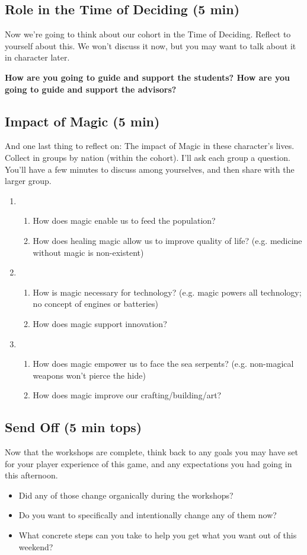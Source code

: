 \documentclass[green]{GL2020}
\begin{document}
\subsection*{Role in the Time of Deciding (5 min)}
Now we’re going to think about our cohort in the Time of Deciding. Reflect to yourself about this. We won't discuss it now, but you may want to talk about it in character later.

\textbf{How are you going to guide and support the students? How are you going to guide and support the advisors?}

\subsection*{Impact of Magic (5 min)}
And one last thing to reflect on: The impact of Magic in these character’s lives. Collect in groups by nation (within the cohort). I’ll ask each group a question. You’ll have a few minutes to discuss among yourselves, and then share with the larger group.
\begin{enumerate}
	\item \pFarm{}
	\begin{enumerate}
		\item How does magic enable us to feed the population?
		\item How does healing magic allow us to improve quality of life? (e.g. medicine without magic is non-existent)
	\end{enumerate}
	\item \pTech{}
	\begin{enumerate}
		\item How is magic necessary for technology? (e.g. magic powers all technology; no concept of engines or batteries)
		\item How does magic support innovation?
	\end{enumerate}
	\item \pShip{}
	\begin{enumerate}
		\item How does magic empower us to face the sea serpents? (e.g. non-magical weapons won’t pierce the hide)
		\item How does magic improve our crafting/building/art?
	\end{enumerate}
\end{enumerate}

\subsection*{Send Off (5 min tops)}
Now that the workshops are complete, think back to any goals you may have set for your player experience of this game, and any expectations you had going in this afternoon. 
\begin{itemize}
	\item Did any of those change organically during the workshops? 
	\item Do you want to specifically and intentionally change any of them now? 
	\item What concrete steps can you take to help you get what you want out of this weekend?
\end{itemize}
\end{document}
